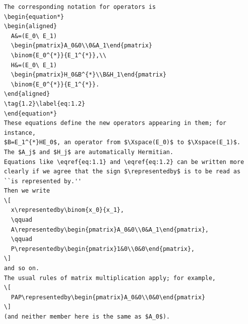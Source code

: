 \begin{verbatim}
The corresponding notation for operators is
\begin{equation*}
\begin{aligned}
  A&=(E_0\ E_1)
  \begin{pmatrix}A_0&0\\0&A_1\end{pmatrix}
  \binom{E_0^{*}}{E_1^{*}},\\
  H&=(E_0\ E_1)
  \begin{pmatrix}H_0&B^{*}\\B&H_1\end{pmatrix}
  \binom{E_0^{*}}{E_1^{*}}.
\end{aligned}
\tag{1.2}\label{eq:1.2}
\end{equation*}
These equations define the new operators appearing in them; for instance,
$B=E_1^{*}HE_0$, an operator from $\Xspace(E_0)$ to $\Xspace(E_1)$.
The $A_j$ and $H_j$ are automatically Hermitian.
Equations like \eqref{eq:1.1} and \eqref{eq:1.2} can be written more clearly if we agree that the sign $\representedby$ is to be read as ``is represented by.''
Then we write
\[
  x\representedby\binom{x_0}{x_1},
  \qquad
  A\representedby\begin{pmatrix}A_0&0\\0&A_1\end{pmatrix},
  \qquad
  P\representedby\begin{pmatrix}1&0\\0&0\end{pmatrix},
\]
and so on.
The usual rules of matrix multiplication apply; for example,
\[
  PAP\representedby\begin{pmatrix}A_0&0\\0&0\end{pmatrix}
\]
(and neither member here is the same as $A_0$).


\end{verbatim}
